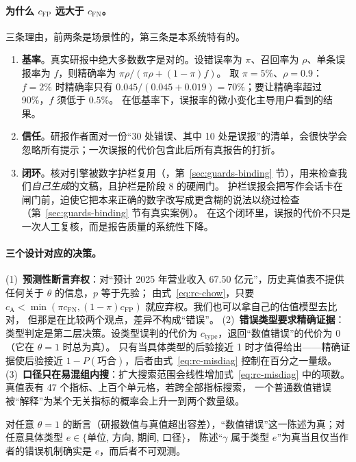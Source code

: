 \paragraph{为什么 $c_{\text{FP}}$ 远大于 $c_{\text{FN}}$。}三条理由，前两条是场景性的，第三条是本系统特有的。
\begin{enumerate}
\item \textbf{基率}。真实研报中绝大多数数字是对的。设错误率为 $\pi$、召回率为 $\rho$、单条误报率为 $f$，则精确率为 $\pi\rho/(\pi\rho+(1-\pi)f)$。
  取 $\pi=5\%$、$\rho=0.9$：$f=2\%$ 时精确率只有 $0.045/(0.045+0.019)=70\%$；要让精确率超过 90\%，$f$ 须低于 $0.5\%$。
  在低基率下，误报率的微小变化主导用户看到的结果。
\item \textbf{信任}。研报作者面对一份“30 处错误、其中 10 处是误报”的清单，会很快学会忽略所有提示；一次误报的代价包含此后所有真报告的打折。
\item \textbf{闭环}。核对引擎被数字护栏复用（，第~\ref{sec:guards-binding} 节），用来检查我们\emph{自己生成}的文稿，且护栏是阶段 8 的硬闸门。
  护栏误报会把写作会话卡在闸门前，迫使它把本来正确的数字改写成更含糊的说法以绕过检查（第~\ref{sec:guards-binding} 节有真实案例）。
  在这个闭环里，误报的代价不只是一次人工复核，而是报告质量的系统性下降。
\end{enumerate}

\paragraph{三个设计对应的决策。}
(1)~\textbf{预测性断言弃权}：对“预计 2025 年营业收入 67.50 亿元”，历史真值表不提供任何关于 $\theta$ 的信息，$p$ 等于先验；
由式~\eqref{eq:rc-chow}，只要 $c_{\text{A}}<\min(\pi c_{\text{FN}},(1-\pi)c_{\text{FP}})$ 就应弃权。我们也可以拿自己的估值模型去比对，
但那是在比较两个观点，差异不构成“错误”。
(2)~\textbf{错误类型要求精确证据}：类型判定是第二层决策。设类型误判的代价为 $c_{\text{type}}$，退回“数值错误”的代价为 0（它在 $\theta=1$ 时总为真）。
只有当具体类型的后验接近 1 时才值得给出——精确证据使后验接近 $1-P(\text{巧合})$，后者由式~\eqref{eq:rc-misdiag} 控制在百分之一量级。
(3)~\textbf{口径只在易混组内搜}：扩大搜索范围会线性增加式~\eqref{eq:rc-misdiag} 中的项数。真值表有 47 个指标、上百个单元格，若跨全部指标搜索，
一个普通数值错误被“解释”为某个无关指标的概率会上升一到两个数量级。

\begin{proposition}
\label{prop:rc-least}
对任意 $\theta=1$ 的断言（研报数值与真值超出容差），“数值错误”这一陈述为真；对任意具体类型 $e\in\{$单位, 方向, 期间, 口径$\}$，
陈述“$\gamma$ 属于类型 $e$”为真当且仅当作者的错误机制确实是 $e$，而后者不可观测。
\end{proposition}


